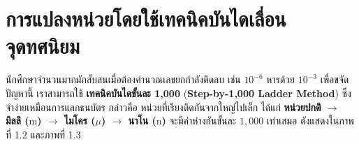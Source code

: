 \section{การแปลงหน่วยโดยใช้เทคนิคบันไดเลื่อนจุดทศนิยม}


นักศึกษาจำนวนมากมักสับสนเมื่อต้องคำนวณเลขยกกำลังติดลบ เช่น $10^{-6}$ หารด้วย $10^{-3}$ เพื่อขจัดปัญหานี้ เราสามารถใช้ \textbf{เทคนิคบันไดขั้นละ 1,000} (\textbf{Step-by-1,000 Ladder Method}) ซึ่งจำง่ายเหมือนการแลกธนบัตร กล่าวคือ หน่วยที่เรียงติดกันจากใหญ่ไปเล็ก ได้แก่ \textbf{หน่วยปกติ $\rightarrow$ มิลลิ ($\text{m}$) $\rightarrow$ ไมโคร ($\mu$) $\rightarrow$ นาโน ($\text{n}$)} จะมีค่าห่างกันขั้นละ $1{,}000$ เท่าเสมอ ดังแสดงใน\mbox{ภาพที่} 1.2 และ\mbox{ภาพที่} 1.3


